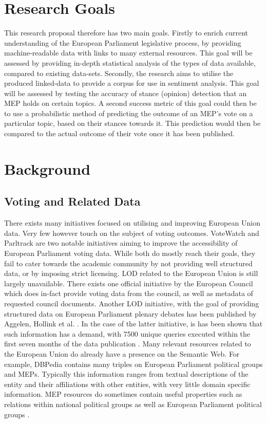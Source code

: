 \documentclass{article}
\begin{document}
\section{Research Goals}
This research proposal therefore has two main goals. Firstly to enrich current understanding of the European Parliament legislative process, by providing machine-readable data with 
links to many external resources. This goal will be assessed by providing in-depth statistical analysis of the types of data available, compared to existing data-sets.
\newline
Secondly, the research aims to utilise the produced linked-data to provide a corpus for use in sentiment analysis. This goal will be assessed by testing the accuracy of stance 
(opinion) detection that an MEP holds on certain topics. A second success metric of this goal could then be to use a probabilistic method of predicting the outcome of an MEP's vote 
on a particular topic, based on their stances towards it. This prediction would then be compared to the actual outcome of their vote once it has been published.

\section{Background}
\subsection{Voting and Related Data}
There exists many initiatives focused on utilising and improving European Union data. Very few however touch on the subject of voting outcomes. VoteWatch \cite{votewatch} and 
Parltrack \cite{parltrack} are two notable initiatives aiming to improve the accessibility of European Parliament voting data. While both do mostly reach their goals, they fail to 
cater towards the academic community by not providing well structured data, or by imposing strict licensing.
\newline
LOD related to the European Union is still largely unavailable. There exists one official initiative by the European Council \cite{EUCouncilLOD} which does in-fact provide voting 
data from the council, as well as metadata of requested council documents. Another LOD initiative, with the goal of providing structured data on European Parliament plenary debates 
has been published by Aggelen, Hollink et al. \cite{LinkedPolitics}. In the case of the latter initiative, is has been shown that such information has a demand, with 7500 unique 
queries executed within the first seven months of the data publication \cite{Aggelen2017TheDO}.
\newline
Many relevant resources related to the European Union do already have a presence on the Semantic Web. For example, DBPedia contains many triples on European Parliament political 
groups and MEPs. Typically this information ranges from textual descriptions of the entity and their affiliations with other entities, with very little domain specific information. 
MEP resources do sometimes contain useful properties such as relations within national political groups as well as European Parliament political groups \cite{DBPediaExample}.
\end{document}
